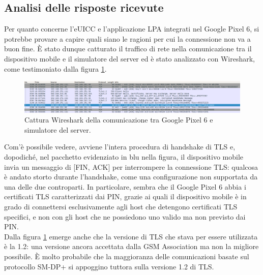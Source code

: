 \documentclass[10pt, oneside]{book}
\begin{document}
\subsection{Analisi delle risposte ricevute}
Per quanto concerne l'eUICC e l'applicazione LPA integrati nel Google Pixel 6, si potrebbe provare a capire quali siano le ragioni per cui la connessione non va a buon fine. È stato dunque catturato il traffico di rete nella comunicazione tra il dispositivo mobile e il simulatore del server ed è stato analizzato con Wireshark, come testimoniato dalla figura \ref{fig:wireshark-pixel}.
\begin{figure}
\includegraphics[width=\linewidth]{wireshark-pixel.png}
\caption{Cattura Wireshark della comunicazione tra Google Pixel 6 e simulatore del server.}
\label{fig:wireshark-pixel}
\end{figure}
Com'è possibile vedere, avviene l'intera procedura di handshake di TLS e, dopodiché, nel pacchetto evidenziato in blu nella figura, il dispositivo mobile invia un messaggio di [FIN, ACK] per interrompere la connessione TLS: qualcosa è andato storto durante l'handshake, come una configurazione non supportata da una delle due controparti. In particolare, sembra che il Google Pixel 6 abbia i certificati TLS caratterizzati dai PIN, grazie ai quali il dispositivo mobile è in grado di connettersi esclusivamente agli host che detengono certificati TLS specifici, e non con gli host che ne possiedono uno valido ma non previsto dai PIN.\\
Dalla figura \ref{fig:wireshark-pixel} emerge anche che la versione di TLS che stava per essere utilizzata è la 1.2: una versione ancora accettata dalla GSM Association ma non la migliore possibile. È molto probabile che la maggioranza delle comunicazioni basate sul protocollo SM-DP+ si appoggino tuttora sulla versione 1.2 di TLS.\\
\end{document}
